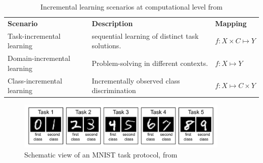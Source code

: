 \begin{table}[H]
\begin{tabularx}{0.9\textwidth}{l | X | l}
    \textbf{Scenario} & \textbf{Description} & \textbf{Mapping} \\
     Task-incremental learning & sequential learning of distinct task solutions. & $f:X\times C \mapsto Y$  \\
     Domain-incremental learning & Problem-solving in different contexts.&$f:X\mapsto Y$\\
     Class-incremental learning & Incrementally observed class discrimination & $f:X\mapsto C\times Y$

\end{tabularx}
     \caption{Incremental learning scenarios at computational level from \citep{van2022three}}
     \label{tab:incr_learning}
\end{table}

\begin{figure}[H]
    \centering
    \includegraphics[width=0.9\textwidth]{Images/tasks_example_mnist.png}
    \caption{Schematic view of an MNIST task protocol, from \citep{van2019three}}
    \label{fig:mnistTaskProtocol}
\end{figure}


